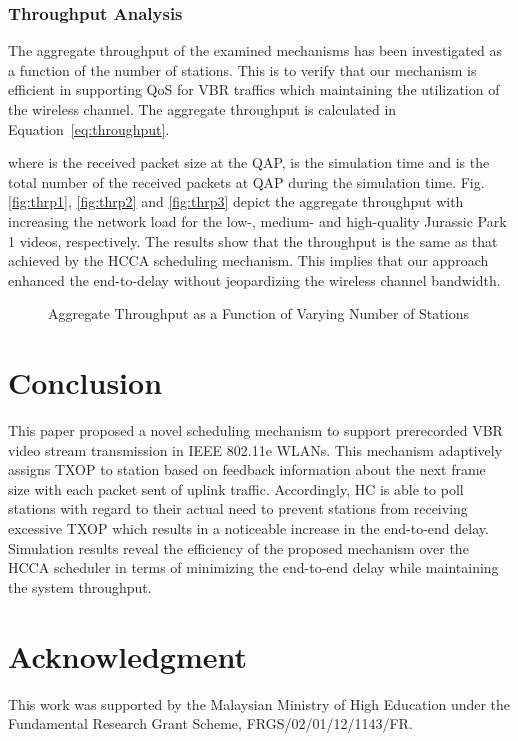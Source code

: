 \documentclass[a4paper, conference]{IEEEtran}
\begin{document}
\subsubsection{Throughput Analysis}
The aggregate throughput of the examined mechanisms has been investigated as a function of the number of stations. This is to verify that our mechanism is efficient in supporting QoS for VBR traffics which maintaining the utilization of the wireless channel. The aggregate throughput is calculated in Equation~\eqref{eq:throughput}.

where  is the received packet size at the QAP,  is the simulation time and  is the total number of the received packets at QAP during the simulation time. Fig. \ref{fig:thrp1},  \ref{fig:thrp2} and \ref{fig:thrp3} depict the aggregate throughput with increasing the network load for the low-, medium- and high-quality Jurassic Park 1 videos,  respectively. The results show that the throughput is the same as that achieved by the HCCA scheduling mechanism. This implies that our approach enhanced the end-to-delay without jeopardizing the wireless channel bandwidth.

\begin{figure}[t]
\centering
{}
\caption{Aggregate Throughput as a Function of Varying Number of Stations}
\end{figure}












\section{Conclusion}
\label{sec:conclusion}
This paper proposed a novel scheduling mechanism to support prerecorded VBR video stream transmission in IEEE 802.11e WLANs. This mechanism adaptively assigns TXOP to station based on feedback information about the next frame size with each packet sent of uplink traffic. Accordingly, HC is able to poll stations with regard to their actual need to prevent stations from receiving excessive TXOP which results in a noticeable increase in the end-to-end delay. Simulation results reveal the efficiency of the proposed mechanism over the HCCA scheduler in terms of minimizing the end-to-end delay while maintaining the system throughput.


\section*{Acknowledgment}
This work was supported by the Malaysian Ministry of High Education under the Fundamental Research Grant Scheme, FRGS/02/01/12/1143/FR.




\end{document}
